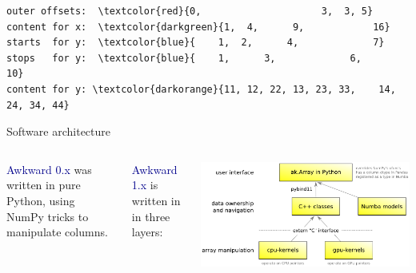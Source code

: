 \documentclass[aspectratio=169]{beamer}
\begin{document}
\begin{frame}[fragile]{}
\begin{onlyenv}
\vspace{0.25 cm}
\begin{Verbatim}[commandchars=\\\{\}]
outer offsets:  \textcolor{red}{0,                     3,  3, 5}
content for x:  \textcolor{darkgreen}{1,  4,      9,            16}
starts  for y:  \textcolor{blue}{    1,  2,      4,             7}
stops   for y:  \textcolor{blue}{    1,      3,             6,            10}
content for y: \textcolor{darkorange}{11, 12, 22, 13, 23, 33,    14, 24, 34, 44}
\end{Verbatim}
\vspace{5 cm}
\end{onlyenv}
\end{frame}

\begin{frame}{Software architecture}
\large
\vspace{0.5 cm}
\begin{columns}
\textcolor{darkblue}{Awkward 0.x} was written in pure Python, using NumPy tricks to manipulate columns.

\vspace{0.5 cm}
\textcolor{darkblue}{Awkward 1.x} is written in in three layers:

\begin{center}
\includegraphics[width=0.7\linewidth]{img/awkward-1-0-layers.pdf}
\end{center}
\end{columns}
\end{frame}
\end{document}
